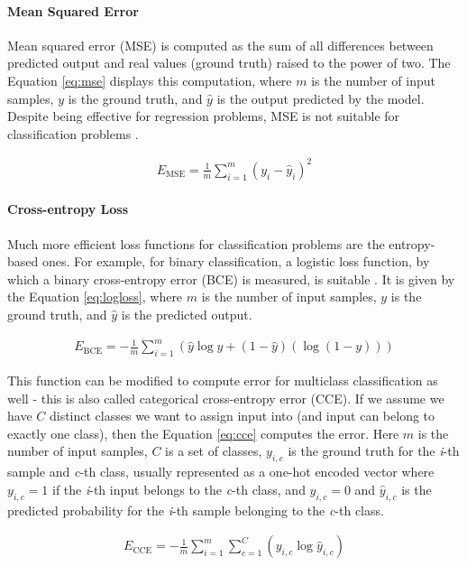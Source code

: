 \paragraph{Mean Squared Error}
Mean squared error (MSE) is computed as the sum of all differences between predicted output and real values (ground truth) raised to the power of two. The Equation \ref{eq:mse} displays this computation, where $m$ is the number of input samples, $y$ is the ground truth, and $\hat{y}$ is the output predicted by the model. Despite being effective for regression problems, MSE is not suitable for classification problems \cite{Santosh2022-2}.

\begin{align}
\label{eq:mse}
    E_\text{MSE} = \frac{1}{m}\sum_{i=1}^m(y_i-\hat{y}_i)^2
\end{align}

\paragraph{Cross-entropy Loss}
Much more efficient loss functions for classification problems are the entropy-based ones. For example, for binary classification, a logistic loss function, by which a binary cross-entropy error (BCE) is measured, is suitable \cite{Santosh2022-2}. It is given by the Equation \ref{eq:logloss}, where $m$ is the number of input samples, $y$ is the ground truth, and $\hat{y}$ is the predicted output.

\begin{align}
\label{eq:logloss}
    E_\text{BCE} = -\frac{1}{m}\sum_{i=1}^m(\hat{y}\log{y}+(1-\hat{y})(\log{(1-y)}))
\end{align}

This function can be modified to compute error for multiclass classification as well - this is also called categorical cross-entropy error (CCE). If we assume we have $C$ distinct classes we want to assign input into (and input can belong to exactly one class), then the Equation \ref{eq:cce} computes the error. Here $m$ is the number of input samples, $C$ is a set of classes, $y_{i,c}$ is the ground truth for the \textit{i}-th sample and \textit{c}-th class, usually represented as a one-hot encoded vector where $y_{i,c}=1$ if the \textit{i}-th input belongs to the \textit{c}-th class, and $y_{i,c}=0$ and $\hat{y}_{i,c}$ is the predicted probability for the \textit{i}-th sample belonging to the \textit{c}-th class.

\begin{align}
\label{eq:cce}
    E_\text{CCE} = -\frac{1}{m}\sum_{i=1}^m\sum_{c=1}^C(y_{i,c}\log{\hat{y}_{i,c}})
\end{align}

